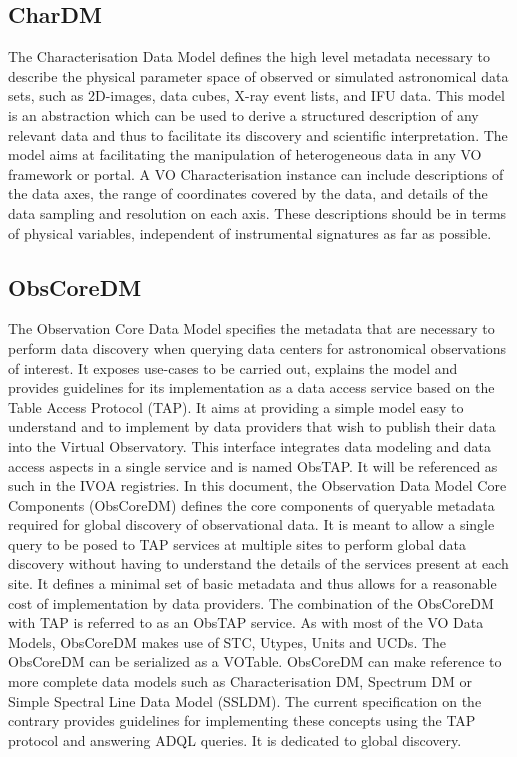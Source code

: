 \documentclass[11pt,a4paper]{ivoa}
\begin{document}
\subsection{CharDM} 

The Characterisation Data Model defines the high level metadata necessary to describe the 
physical parameter space of observed or simulated astronomical data sets, such as 2D-images, 
data cubes, X-ray event lists, and IFU data. This model is an abstraction which can be used 
to derive a structured description of any relevant data and thus to facilitate its discovery 
and scientific interpretation. The model aims at facilitating the manipulation of heterogeneous 
data in any VO framework or portal. A VO Characterisation instance can include descriptions of 
the data axes, the range of coordinates covered by the data, and details of the data sampling 
and resolution on each axis. These descriptions should be in terms of physical variables, 
independent of instrumental signatures as far as possible.

\subsection{ObsCoreDM}

The Observation Core Data Model specifies the metadata that are necessary to perform data 
discovery when querying data centers for astronomical observations of interest. It exposes 
use-cases to be carried out, explains the model and provides guidelines for its implementation 
as a data access service based on the Table Access Protocol (TAP). It aims at providing a 
simple model easy to understand and to implement by data providers that wish to publish their 
data into the Virtual Observatory. This interface integrates data modeling and data access 
aspects in a single service and is named ObsTAP. It will be referenced as such in the IVOA 
registries. In this document, the Observation Data Model Core Components (ObsCoreDM) defines 
the core components of queryable metadata required for global discovery of observational data.
It is meant to allow a single query to be posed to TAP services at multiple sites to perform 
global data discovery without having to understand the details of the services present at each 
site. It defines a minimal set of basic metadata and thus allows for a reasonable cost of 
implementation by data providers. The combination of the ObsCoreDM with TAP is referred to 
as an ObsTAP service. As with most of the VO Data Models, ObsCoreDM makes use of STC, Utypes, 
Units and UCDs. The ObsCoreDM can be serialized as a VOTable. ObsCoreDM can make reference 
to more complete data models such as Characterisation DM, Spectrum DM or Simple Spectral Line 
Data Model (SSLDM). The current specification on the contrary provides guidelines for 
implementing these concepts using the TAP protocol and answering ADQL queries. It is 
dedicated to global discovery.
\end{document}
